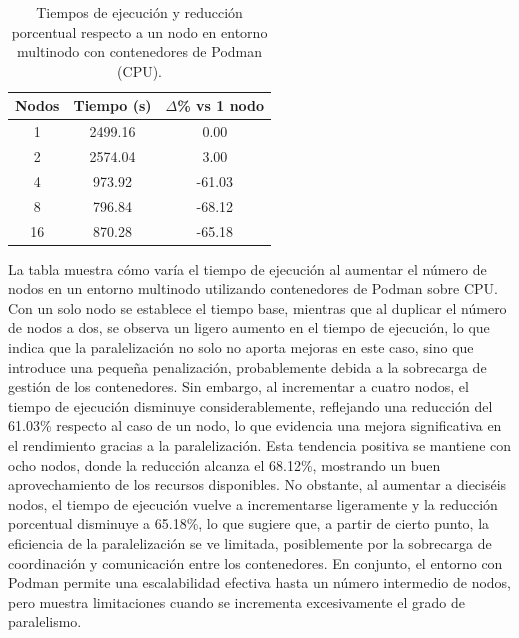 \begin{table}[ht]
    \centering
    \begin{tabular}{|c|c|c|}
        \hline
        \textbf{Nodos} & \textbf{Tiempo (s)} & \textbf{$\Delta$\% vs 1 nodo} \\
        \hline
        1              & 2499.16             & 0.00                          \\
        2              & 2574.04             & 3.00                          \\
        4              & 973.92              & -61.03                        \\
        8              & 796.84              & -68.12                        \\
        16             & 870.28              & -65.18                        \\
        \hline
    \end{tabular}
    \caption{Tiempos de ejecución y reducción porcentual respecto a un nodo en entorno multinodo con contenedores de Podman (CPU).}
    \label{tab:multi-node_ubuntu_podman}
\end{table}

La tabla muestra cómo varía el tiempo de ejecución al aumentar el número de nodos en un entorno multinodo utilizando contenedores de Podman sobre CPU. Con un solo nodo se establece el tiempo base, mientras que al duplicar el número de nodos a dos, se observa un ligero aumento en el tiempo de ejecución, lo que indica que la paralelización no solo no aporta mejoras en este caso, sino que introduce una pequeña penalización, probablemente debida a la sobrecarga de gestión de los contenedores. Sin embargo, al incrementar a cuatro nodos, el tiempo de ejecución disminuye considerablemente, reflejando una reducción del 61.03\% respecto al caso de un nodo, lo que evidencia una mejora significativa en el rendimiento gracias a la paralelización. Esta tendencia positiva se mantiene con ocho nodos, donde la reducción alcanza el 68.12\%, mostrando un buen aprovechamiento de los recursos disponibles. No obstante, al aumentar a dieciséis nodos, el tiempo de ejecución vuelve a incrementarse ligeramente y la reducción porcentual disminuye a 65.18\%, lo que sugiere que, a partir de cierto punto, la eficiencia de la paralelización se ve limitada, posiblemente por la sobrecarga de coordinación y comunicación entre los contenedores. En conjunto, el entorno con Podman permite una escalabilidad efectiva hasta un número intermedio de nodos, pero muestra limitaciones cuando se incrementa excesivamente el grado de paralelismo.

